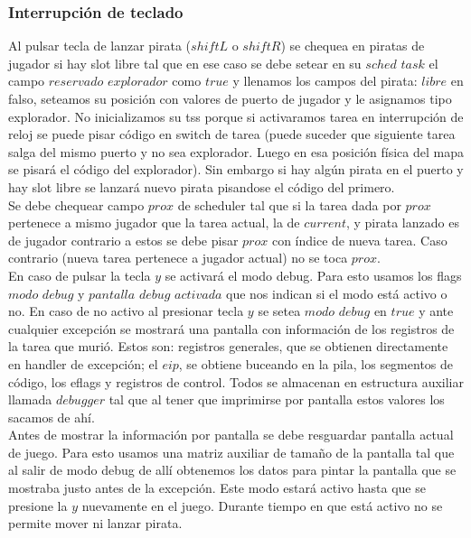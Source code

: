 \subsubsection{Interrupción de teclado}
Al pulsar tecla de lanzar pirata ($shift L$ o $shift R$) se chequea en piratas de jugador si hay slot libre
tal que en ese caso se debe setear en su $sched$ $task$ el campo $reservado$ $explorador$ como $true$ y 
llenamos 
los campos del pirata: $libre$ en falso, seteamos su posición con valores de puerto de jugador y le asignamos
tipo explorador. No inicializamos su tss porque si activaramos tarea en interrupción de reloj se puede pisar 
código en switch de tarea (puede suceder que siguiente tarea salga del mismo puerto y no sea explorador.
Luego en esa posición física del mapa se pisará el código del explorador). Sin embargo si hay algún pirata
en el puerto y hay slot libre se lanzará nuevo pirata pisandose el código del primero.\\
Se debe chequear campo $prox$ de scheduler tal que si la tarea dada por $prox$ pertenece a mismo jugador que
la tarea actual, la de $current$, y pirata lanzado es de jugador contrario a estos se debe 
pisar $prox$ con índice de nueva tarea. Caso contrario (nueva tarea pertenece a jugador actual) no se toca $prox$.\\

En caso de pulsar la tecla $y$ se activará el modo debug. Para esto usamos los flags $modo$ $debug$ y
$pantalla$ $debug$ $activada$ que nos indican si el modo está activo o no. En caso de no activo al presionar
tecla $y$ se setea $modo$ $debug$ en $true$ y ante cualquier excepción se mostrará una pantalla con información
de los registros de la tarea que murió. Estos son: registros generales, que se obtienen directamente en handler de 
excepción; el $eip$, se obtiene buceando en la pila, los segmentos de código, los eflags y registros de control. Todos se almacenan en estructura auxiliar
llamada $debugger$ tal que al tener que imprimirse por pantalla estos valores los sacamos de ahí.\\
Antes de mostrar la información por pantalla se debe resguardar pantalla actual de juego. Para esto usamos
una matriz auxiliar de tamaño de la pantalla tal que al salir de modo debug de allí obtenemos los datos para 
pintar la pantalla que se mostraba justo antes de la excepción. Este modo estará activo hasta que se presione
la $y$ nuevamente en el juego. Durante tiempo en que está activo no se permite mover ni lanzar pirata.\\

